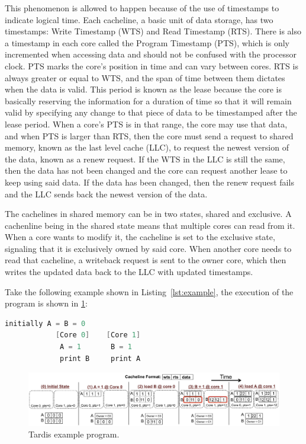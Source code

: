 \documentclass[12pt]{article}
\begin{document}
This phenomenon is allowed to happen because of the use of timestamps 
to indicate logical time. Each cacheline, a basic unit of data 
storage, has two timestamps: Write Timestamp (WTS) and Read Timestamp 
(RTS). There is also a timestamp in each core called the Program 
Timestamp (PTS), which is only incremented when accessing data and 
should not be confused with the processor clock. PTS marks the core’s 
position in time and can vary between cores. RTS is always greater or 
equal to WTS, and the span of time between them dictates when the data 
is valid. This period is known as the lease because the core is 
basically reserving the information for a duration of time so that it 
will remain valid by specifying any change to that piece of data to be 
timestamped after the lease period. When a core’s PTS is in that 
range, the core may use that data, and when PTS is larger than RTS, 
then the core must send a request to shared memory, known as the last 
level cache (LLC), to request the newest version of the data, known as 
a renew request.  If the WTS in the LLC is still the same, then the 
data has not been changed and the core can request another lease to 
keep using said data. If the data has been changed, then the renew 
request fails and the LLC sends back the newest version of the data.

The cachelines in shared memory can be in two states, shared and 
exclusive. A cachenline being in the shared state means that multiple 
cores can read from it. When a core wants to modify it, the cacheline 
is set to the exclusive state, signaling that it is exclusively owned 
by said core. When another core needs to read that cacheline, a 
writeback request is sent to the owner core, which then writes the 
updated data back to the LLC with updated timestamps.

Take the following example shown in Listing~\ref{lst:example}, the 
execution of the program is shown in \cref{fig:example}:

\vspace{-.1in}
\begin{lstlisting}[language=C,label={lst:example},caption={Example 
Program}]
			  initially A = B = 0
			[Core 0]	[Core 1]
			 A = 1		 B = 1
			 print B	 print A
\end{lstlisting}


\begin{figure}
	\centering
	\includegraphics[width=0.95\columnwidth]{figs/example.pdf}
	\caption{ Tardis example program.}
	\label{fig:example}
\end{figure}
\end{document}
